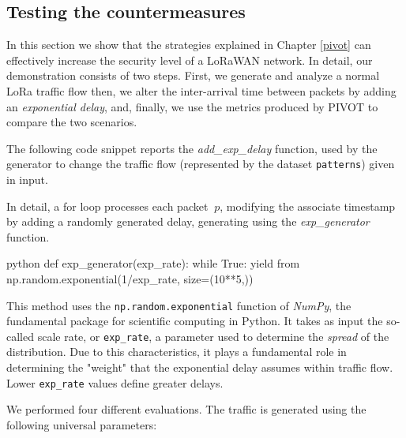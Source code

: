 \vspace{3mm}


\subsection{Testing the countermeasures}
In this section we show that the strategies explained in Chapter \ref{pivot} can effectively increase the security level of a LoRaWAN network. In detail, our demonstration consists of two steps. First, we generate and analyze a normal LoRa traffic flow then, we alter the inter-arrival time between packets by adding an \textit{exponential delay}, and, finally, we use the metrics produced by PIVOT to compare the two scenarios.

\vspace{3mm}

The following code snippet reports the \textit{add\_exp\_delay} function, used by the generator to change the traffic flow (represented by the dataset \texttt{patterns}) given in input.

\vspace{3mm}

\vspace{3mm}

In detail, a for loop processes each packet \(\ p \), modifying the associate timestamp by adding a randomly generated delay, generating using the \textit{exp\_generator} function.

\vspace{3mm}
\begin{mintedbox}{python}
def exp_generator(exp_rate):
    while True:
        yield from np.random.exponential(1/exp_rate, size=(10**5,))
\end{mintedbox}
\vspace{3mm}

This method uses the \texttt{np.random.exponential} function of \textit{NumPy}, the fundamental package for scientific computing in Python. It takes as input the so-called scale rate, or \texttt{exp\_rate}, a parameter used to determine the \textit{spread} of the distribution. Due to this characteristics, it plays a fundamental role in determining the "weight" that the exponential delay assumes within traffic flow. Lower \texttt{exp\_rate} values define greater delays.

\vspace{3mm}

We performed four different evaluations. The traffic is generated using the following universal parameters:

